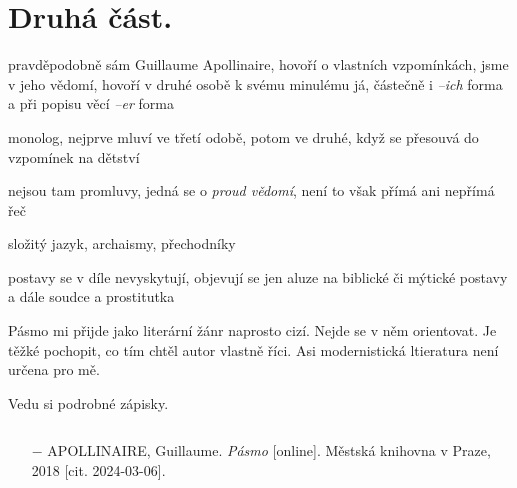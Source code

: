 \documentclass{article}
\begin{document}
\section{Druhá část.}
\begin{description}
    \setlength\itemsep{0.15em}
    \item[lyrický subjekt:] pravděpodobně sám Guillaume Apollinaire, hovoří o vlastních vzpomínkách, jsme v jeho vědomí, hovoří v druhé osobě k svému minulému já, částečně i \textit{--ich} forma a při popisu věcí \textit{--er} forma
    \item[vyprávěcí způsoby:] monolog, nejprve mluví ve třetí odobě, potom ve druhé, když se přesouvá do vzpomínek na dětství
    \item[typy promluv:] nejsou tam promluvy, jedná se o \textit{proud vědomí}, není to však přímá ani nepřímá řeč
    \item[jazyková stránka:] složitý jazyk, archaismy, přechodníky
    \item[postavy:] postavy se v díle nevyskytují, objevují se jen aluze na biblické či mýtické postavy a dále soudce a prostitutka
    \item[názor:] Pásmo mi přijde jako literární žánr naprosto cizí. Nejde se v něm orientovat. Je těžké pochopit, co tím chtěl autor vlastně říci. Asi modernistická ltieratura není určena pro mě.
    \item[kontext:] Vedu si podrobné zápisky.
    \item[zdroje:] $ $
    \begin{itemize}
        \setlength\itemsep{0em}
        \item[$-$] APOLLINAIRE, Guillaume. \textit{Pásmo} [online]. Městská knihovna v Praze, 2018 [cit. 2024-03-06].
    \end{itemize}
\end{description}
\end{document}
